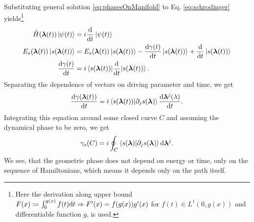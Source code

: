 Substituting general solution \ref{eq:phasesOnManifold} to Eq. \ref{eq:schrodinger} yields\footnote{Here the derivation along upper bound $F(x)\coloneqq\int_0^{g(x)}f(t)\mathrm{d} t \Rightarrow F'(x)=f(g(x))g'(x)$ for $f(t)\in L^1(0,g(x))$ and differentiable function $g$, is used.} 
\begin{align}
    \hat{H}({\bm\lambda}(t))\ket{\psi(t)} &= i\frac{\mathrm{d} }{\mathrm{d} t}\ket{\psi(t)}\\
    E_s({\bm\lambda}(t)) \ket{s({\bm\lambda}(t))} &= E_s({\bm\lambda}(t))\ket{s({\bm\lambda}(t))} -\frac{\mathrm{d} \gamma(t)}{\mathrm{d} t}\ket{s({\bm\lambda}(t))}+ \frac{\mathrm{d} }{\mathrm{d} t}\ket{s({\bm\lambda}(t))}\\
    \frac{\mathrm{d} \gamma(t)}{\mathrm{d} t}&=i\braket{s({\bm\lambda}(t))|
    \frac{\mathrm{d} }{\mathrm{d} t}|s({\bm\lambda}(t))}.
\end{align}
 Separating the dependence of vectors on driving parameter and time, we get
\begin{equation}
    \frac{\mathrm{d} \gamma({\bm\lambda}(t))}{\mathrm{d} t} =i\braket{s({\bm\lambda}(t))|\partial_j s({\bm\lambda})} \frac{\mathrm{d} {\bm\lambda}^j(\lambda)}{\mathrm{d} t} .
\end{equation}
Integrating this equation around some closed curve $C$ and assuming the dynamical phase to be zero, we get
\begin{equation}
    \gamma_s(C)=i\oint_C\braket{s({\bm\lambda})|\partial_j s({\bm\lambda})}\mathrm{d} {\bm\lambda}^j.
    \label{eq:gammaCoint}
\end{equation}
We see, that the geometric phase does not depend on energy or time, only on the sequence of Hamiltonians, which means it depends only on the path itself.



